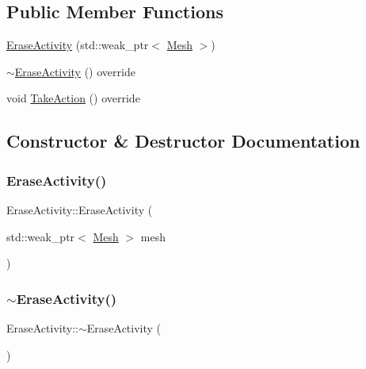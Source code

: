 \subsection*{Public Member Functions}
\begin{DoxyCompactItemize}
\item 
\mbox{\hyperlink{class_erase_activity_a8e8ebce3c002e54ab2896008a84a6826}{Erase\+Activity}} (std\+::weak\+\_\+ptr$<$ \mbox{\hyperlink{class_mesh}{Mesh}} $>$)
\item 
\mbox{\hyperlink{class_erase_activity_aa574e3b611db829a217ec76ee4cd8ce6}{$\sim$\+Erase\+Activity}} () override
\item 
void \mbox{\hyperlink{class_erase_activity_a3d5533cbfa19a18a58bb77a5e9daf586}{Take\+Action}} () override
\end{DoxyCompactItemize}


\subsection{Constructor \& Destructor Documentation}
\mbox{\label{class_erase_activity_a8e8ebce3c002e54ab2896008a84a6826}} 
\subsubsection{\texorpdfstring{EraseActivity()}{EraseActivity()}}
{\footnotesize\ttfamily Erase\+Activity\+::\+Erase\+Activity (\begin{DoxyParamCaption}\item[{std\+::weak\+\_\+ptr$<$ \mbox{\hyperlink{class_mesh}{Mesh}} $>$}]{mesh }\end{DoxyParamCaption})\hspace{0.3cm}{\ttfamily [explicit]}}

\mbox{\label{class_erase_activity_aa574e3b611db829a217ec76ee4cd8ce6}} 
\subsubsection{\texorpdfstring{$\sim$EraseActivity()}{~EraseActivity()}}
{\footnotesize\ttfamily Erase\+Activity\+::$\sim$\+Erase\+Activity (\begin{DoxyParamCaption}{ }\end{DoxyParamCaption})\hspace{0.3cm}{\ttfamily [override]}}



